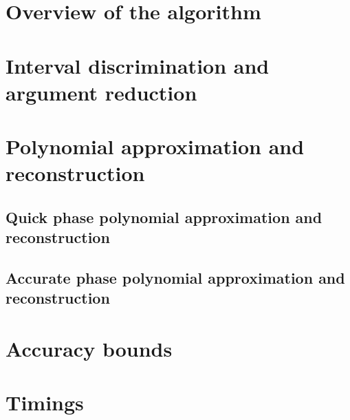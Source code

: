\section{Overview of the algorithm}

\section{Interval discrimination and argument reduction}\label{sec:asinargred}

\section{Polynomial approximation and reconstruction}\label{sec:asinpolynomial}

\subsection{Quick phase polynomial approximation and reconstruction}\label{subsec:asinquickpolynomial}

\subsection{Accurate phase polynomial approximation and reconstruction}\label{subsec:asinquickpolynomial}

\section{Accuracy bounds}\label{sec:asinaccuracy}

\section{Timings}\label{sec:asintiming}
